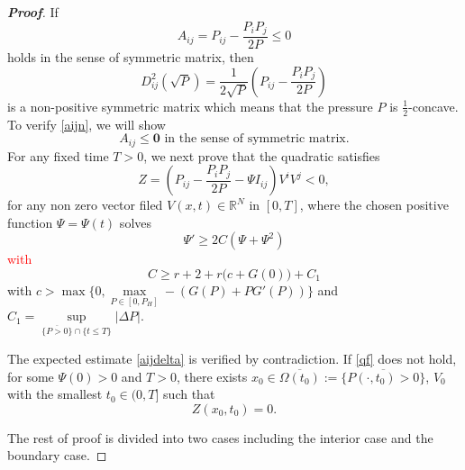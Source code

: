 \documentclass[10pt]{article}         %
\numberwithin{equation}{section}
\begin{document}
\begin{proof}[\bf Proof] If 
\begin{equation}\label{aijn}A_{ij}=P_{ij}-\frac{P_iP_j}{2P}\leq 0\end{equation}
holds in the sense of symmetric matrix, then 
\begin{equation*}
D_{ij}^2(\sqrt{P})=\frac{1}{2\sqrt{P}}(P_{ij}-\frac{P_iP_j}{2P})
\end{equation*}
is a non-positive symmetric matrix which means that the pressure $P$ is $\frac{1}{2}$-concave. 
To verify \eqref{aijn},  we will show 
\begin{equation}\label{aijdelta}A_{ij}\leq \textbf{0}\text{ in the sense of symmetric matrix}.\end{equation}
For any fixed time $T>0$, we next prove that the quadratic satisfies
\begin{equation}\label{qf}
Z=(P_{ij}-\frac{P_iP_j}{2P}-\Psi I_{ij})V^iV^j<0,
\end{equation}
for any non zero vector filed $V(x,t)\in\mathbb{R}^N$ in $[0, T]$, where the chosen positive function $\Psi=\Psi(t)$ solves
\begin{equation}\label{psi}\Psi'\geq 2C(\Psi+\Psi^2)\end{equation}
\textcolor{red}{with} \begin{equation}\label{Cdef}
C\geq r+2+r\big(c+G(0)\big)+C_1
\end{equation}with $c>\max\{0, \max\limits_{P\in[0,P_H]}-(G(P)+PG'(P))\}$ and $C_1=\sup\limits_{\overline{\{P>0\}}\cap\{ t\leq T\}}|\Delta P|$.


The expected estimate \eqref{aijdelta} is verified by contradiction. If \eqref{qf} does not hold, for some  $\Psi(0)>0$ and $T>0$, there exists $x_0\in\overline{\Omega(t_0)}:=\overline{\{P(\cdot,t_0)>0\}}$, $V_0$ with the smallest $t_0\in(0,T]$ such that 
\[Z(x_0,t_0)=0.\]
  
The rest of proof is divided into two cases including the interior case and the boundary case.

\end{proof}
\end{document}
